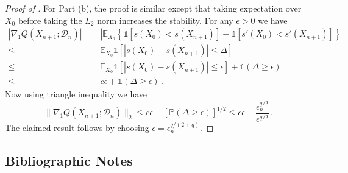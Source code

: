 \documentclass[11pt]{article}
\theoremstyle{plain}
\newcommand{\D}{{\mathcal{D}}}
\begin{document}
\begin{proof}[Proof of ]
For Part (b), the proof is similar except that taking expectation over $X_0$ before taking the $L_2$ norm increases the stability.
For any $\epsilon>0$ we have
\begin{align}
    |\nabla_1 Q(X_{n+1};\D_n)| =&\left|\mathbb E_{X_0}\left\{ \mathds{1}[s(X_0)<s(X_{n+1})]-\mathds{1}[s'(X_0)<s'(X_{n+1})]\right\}\right|\nonumber\\
    \le & \mathbb E_{X_0}\mathds{1}[|s(X_0)-s(X_{n+1})|\le \Delta]\nonumber\\
    \le &\mathbb E_{X_0}\mathds{1}[|s(X_0)-s(X_{n+1})|\le \epsilon]+\mathds{1}(\Delta\ge \epsilon)\nonumber\\
    \le & c\epsilon + \mathds{1}(\Delta\ge \epsilon)\,.\nonumber
\end{align}
Now using triangle inequality we have
$$
\|\nabla_1 Q(X_{n+1};\D_n)\|_2\le c\epsilon + [\mathbb P(\Delta\ge \epsilon)]^{1/2}\le c\epsilon+\frac{\epsilon_n^{q/2}}{\epsilon^{q/2}}\,.
$$
The claimed result follows by choosing $\epsilon=\epsilon_n^{q/(2+q)}$.
\end{proof}



\subsection{Bibliographic Notes}\label{subsec:5.6-bib}

\end{document}
